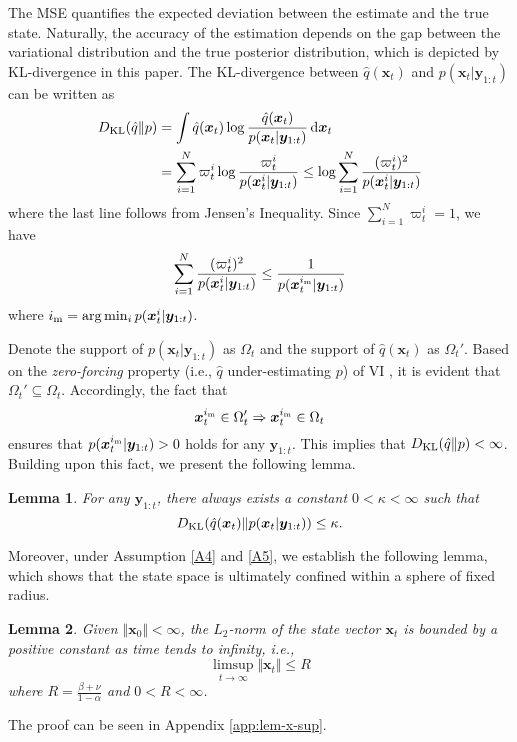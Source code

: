 \documentclass[10pt,twocolumn,twoside]{IEEEtran}
\newtheorem{lemma}{Lemma}
\newcommand{\fs}{\text{.}} %
\newcommand{\x}{{ \bm{x} }}
\newcommand{\y}{{ \bm{y} }}
\begin{document}
The MSE quantifies the expected deviation between the estimate and the true state. Naturally, the accuracy of the estimation depends on the gap between the variational distribution and the true posterior distribution, which is depicted by KL-divergence in this paper. The KL-divergence between $\hat{q}(\x_t)$ and $p(\x_t|\y_{1:t})$ can be written as
\begin{equation*}
\begin{split}
    D_{\rm KL}(\hat{q}\Vert p) &= \int{\hat{q}(\x_t)\log\frac{\hat{q}(\x_t)}{p(\x_t|\y_{1:t})}}\,\mathrm{d}\x_t \\
    &= \sum_{i=1}^N\varpi_t^i\log\frac{\varpi_t^i}{p(\x_t^i|\y_{1:t})} \leq \log{\sum_{i=1}^N\frac{(\varpi_t^i)^2}{p(\x_t^i|\y_{1:t})}} \\
\end{split}
\end{equation*}
where the last line follows from Jensen's Inequality. Since $\sum_{i=1}^N\varpi_t^i=1$, we have
$$
\sum_{i=1}^N\frac{(\varpi_t^i)^2}{p(\x_t^i|\y_{1:t})} \leq \frac{1}{p(\x_t^{i_{\rm m}}|\y_{1:t})}
$$
where $i_{\rm m}=\arg\min_{i}p(\x_t^i|\y_{1:t})$.

Denote the support of $p(\x_t|\y_{1:t})$ as $\Omega_t$ and the support of $\hat{q}(\x_t)$ as $\Omega_t'$. Based on the {\it zero-forcing} property (i.e., $\hat{q}$ under-estimating $p$) of VI \cite{murphy2012machine}, it is evident that $\Omega_t'\subseteq\Omega_t$. Accordingly, the fact that
$$\x_t^{i_{\rm m}}\in\Omega_t' \Rightarrow \x_t^{i_{\rm m}}\in\Omega_t$$
ensures that $p(\x_t^{i_{\rm m}}|\y_{1:t})>0$ holds for any $\y_{1:t}$. This implies that $D_{\rm KL}(\hat{q}\Vert p)<\infty$. Building upon this fact, we present the following lemma.
\begin{lemma} \label{lem:KLD}
For any $\y_{1:t}$, there always exists a constant $0<\kappa<\infty$ such that
$$
D_{\rm KL}(\hat{q}(\x_t)\Vert p(\x_t|\y_{1:t})) \leq \kappa \fs
$$
\end{lemma}

Moreover, under Assumption \ref{A4} and \ref{A5}, we establish the following lemma, which shows that the state space is ultimately confined within a sphere of fixed radius.
\begin{lemma} \label{lem:x-sup}
Given $\Vert\x_0\Vert<\infty$, the $L_2$-norm of the state vector $\x_t$ is bounded by a positive constant as time tends to infinity, i.e., 
$$ \limsup_{t\rightarrow\infty}\Vert\x_t\Vert \leq R $$
where $R = \frac{\beta+\nu}{1-\alpha}$ and $0<R< \infty$. 
\end{lemma}
\begin{IEEEproof}
    The proof can be seen in Appendix \ref{app:lem-x-sup}.
\end{IEEEproof}
\end{document}

